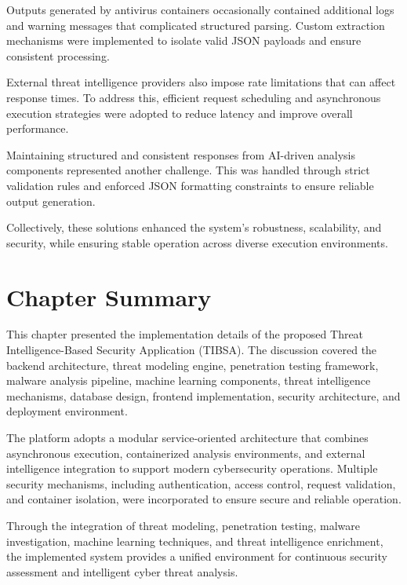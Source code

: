 Outputs generated by antivirus containers occasionally contained additional logs and warning messages that complicated structured parsing. Custom extraction mechanisms were implemented to isolate valid JSON payloads and ensure consistent processing.

External threat intelligence providers also impose rate limitations that can affect response times. To address this, efficient request scheduling and asynchronous execution strategies were adopted to reduce latency and improve overall performance.

Maintaining structured and consistent responses from AI-driven analysis components represented another challenge. This was handled through strict validation rules and enforced JSON formatting constraints to ensure reliable output generation.

Collectively, these solutions enhanced the system's robustness, scalability, and security, while ensuring stable operation across diverse execution environments.

\section{Chapter Summary}
This chapter presented the implementation details of the proposed Threat Intelligence-Based Security Application (TIBSA). The discussion covered the backend architecture, threat modeling engine, penetration testing framework, malware analysis pipeline, machine learning components, threat intelligence mechanisms, database design, frontend implementation, security architecture, and deployment environment.

The platform adopts a modular service-oriented architecture that combines asynchronous execution, containerized analysis environments, and external intelligence integration to support modern cybersecurity operations. Multiple security mechanisms, including authentication, access control, request validation, and container isolation, were incorporated to ensure secure and reliable operation.

Through the integration of threat modeling, penetration testing, malware investigation, machine learning techniques, and threat intelligence enrichment, the implemented system provides a unified environment for continuous security assessment and intelligent cyber threat analysis.
